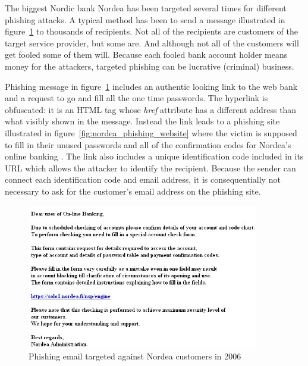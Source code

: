 \documentclass[english,gradu]{tktltiki}
\begin{document}
              The biggest Nordic bank Nordea has been targeted several times for different phishing attacks. A typical method has been to send a message illustrated in figure~\ref{fig:nordea_phishing_email} to thousands of recipients. Not all of the recipients are customers of the target service provider, but some are. And although not all of the customers will get fooled some of them will. Because each fooled bank account holder means money for the attackers, targeted phishing can be lucrative (criminal) business.

                Phishing message in figure~\ref{fig:nordea_phishing_email} includes an authentic looking link to the web bank and a request to go and fill all the one time passwords. The hyperlink is obfuscated: it is an HTML tag whose \emph{href} attribute has a different address than what visibly shown in the message. Instead the link leads to a phishing site illustrated in figure~\ref{fig:nordea_phishing_website} where the victim is supposed to fill in their unused passwords and all of the confirmation codes for Nordea's online banking \cite{nordea_fsecure_2006, nordea_miller_2006}. The link also includes a unique identification code included in its URL which allows the attacker to identify the recipient. Because the sender can connect each identification code and email address, it is consequentially not necessary to ask for the customer's email address on the phishing site.


          \begin{figure}
            \centering
            \includegraphics[width=0.9\textwidth]{images/nordea_phishing_email.jpg}
            \caption{Phishing email targeted against Nordea customers in 2006}
            \label{fig:nordea_phishing_email}
          \end{figure}
\end{document}
